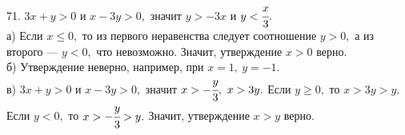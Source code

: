 71. $3x+y>0$ и $x-3y>0,$ значит $y>-3x$ и $y<\cfrac{x}{3}.$\\
а) Если $x\leqslant0,$ то  из первого неравенства следует соотношение $y>0,$ а из второго --- $y<0,$ что невозможно. Значит, утверждение $x>0$ верно.\\
б) Утверждение неверно, например, при $x=1,\ y=-1.$\\
в) $3x+y>0$ и $x-3y>0,$ значит $x>-\cfrac{y}{3},\ x>3y.$ Если $y\geqslant0,$ то $x>3y>y.$ Если $y<0,$ то $x>-\cfrac{y}{3}>y.$ Значит, утверждение $x>y$ верно.\\
